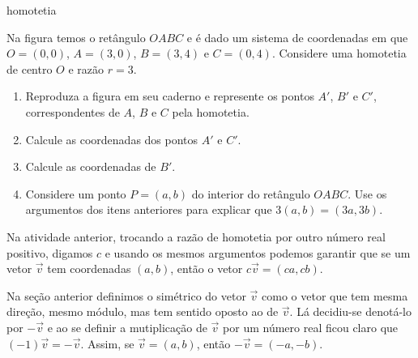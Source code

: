 \begin{task}{ homotetia}
\label{ativ-vetores-homotetia}



Na figura temos o retângulo \(OABC\) e é dado um sistema de coordenadas em que \(O=(0,0)\), \(A=(3,0)\), \(B=(3,4)\) e \(C=(0,4)\).
Considere uma homotetia de centro \(O\) e razão \(r=3\).
\begin{center}
\end{center}\begin{enumerate}
\item {} 
Reproduza a figura em seu caderno e represente os pontos \(A'\), \(B'\) e \(C'\), correspondentes de \(A\), \(B\) e \(C\) pela homotetia.

\item {} 
Calcule as coordenadas dos pontos \(A'\) e \(C'\).

\item {} 
Calcule as coordenadas de \(B'\).

\item {} 
Considere um ponto \(P=(a,b)\) do interior do retângulo \(OABC\). Use os argumentos dos itens anteriores para explicar que \(3(a,b)=(3a,3b)\).

\end{enumerate}
\end{task}



Na atividade anterior, trocando a razão de homotetia por outro número real positivo, digamos \(c\) e usando os mesmos argumentos podemos garantir que se um vetor \(\vec{v}\) tem coordenadas \((a,b)\), então o vetor \(c\vec{v}=(ca,cb)\).

Na seção anterior definimos o simétrico do vetor \(\vec{v}\) como o vetor que tem mesma direção, mesmo módulo, mas tem sentido oposto ao de \(\vec{v}\).
Lá decidiu-se denotá-lo por \(-\vec{v}\) e ao se definir a mutiplicação de \(\vec{v}\) por um número real ficou claro que \((-1)\vec{v}=-\vec{v}\).
Assim, se \(\vec{v}=(a,b)\), então \(-\vec{v} = (-a,-b)\).


